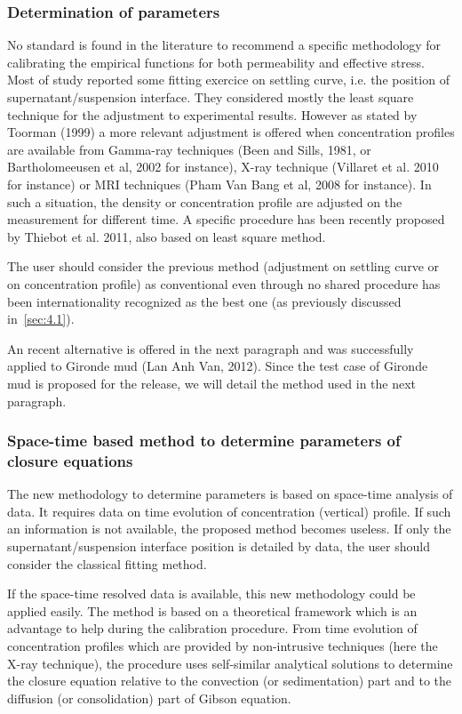 \subsubsection{Determination of parameters}
No standard is found in the literature to recommend a specific methodology
for calibrating the empirical functions for both permeability and effective
stress. Most of study reported some fitting exercice on settling curve, i.e.
the position of supernatant/suspension interface. They considered mostly the
least square technique for the adjustment to experimental results. However
as stated by Toorman (1999) a more relevant adjustment is offered when
concentration profiles are available from Gamma-ray techniques (Been and
Sills, 1981, or Bartholomeeusen et al, 2002 for instance), X-ray technique
(Villaret et al. 2010 for instance) or MRI techniques (Pham Van Bang et al,
2008 for instance). In such a situation, the density or concentration
profile are adjusted on the measurement for different time. A specific
procedure has been recently proposed by Thiebot et al. 2011, also based on
least square method.

The user should consider the previous method (adjustment on settling curve
or on concentration profile) as conventional even through no shared
procedure has been internationality recognized as the best one (as
previously discussed in~\ref{sec:4.1}).

An recent alternative is offered in the next paragraph and was successfully
applied to Gironde mud (Lan Anh Van, 2012). Since the test case of Gironde
mud is proposed for the  release, we will detail the method used
in the next paragraph.

\subsubsection{Space-time based method to determine parameters of closure equations}
The new methodology to determine parameters is based on space-time analysis
of data. It requires data on time evolution of concentration (vertical)
profile. If such an information is not available, the proposed method
becomes useless. If only the supernatant/suspension interface position is
detailed by data, the user should consider the classical fitting method.

If the space-time resolved data is available, this new methodology could be
applied easily. The method is based on a theoretical framework which is an
advantage to help during the calibration procedure. From time evolution of
concentration profiles which are provided by non-intrusive techniques (here
the X-ray technique), the procedure uses self-similar analytical solutions
to determine the closure equation relative to the convection (or
sedimentation) part and to the diffusion (or consolidation) part of Gibson
equation.

